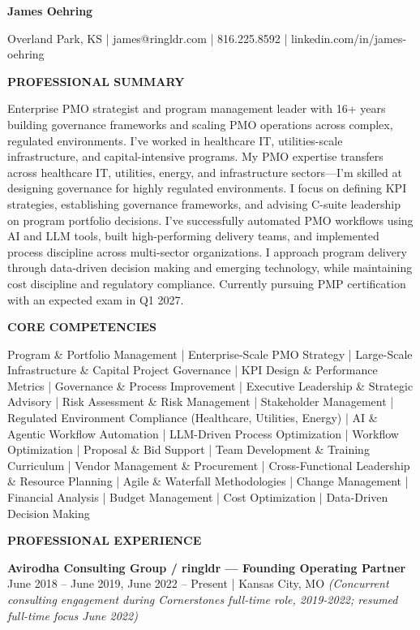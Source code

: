 \documentclass[10pt,letterpaper]{article}
\begin{document}
{\centering \textbf{\Large James Oehring} \par}
{\centering \small Overland Park, KS | james@ringldr.com | 816.225.8592 | linkedin.com/in/james-oehring \par}

\vspace{6pt}

\textbf{PROFESSIONAL SUMMARY}

Enterprise PMO strategist and program management leader with 16+ years building governance frameworks and scaling PMO operations across complex, regulated environments. I've worked in healthcare IT, utilities-scale infrastructure, and capital-intensive programs. My PMO expertise transfers across healthcare IT, utilities, energy, and infrastructure sectors—I'm skilled at designing governance for highly regulated environments. I focus on defining KPI strategies, establishing governance frameworks, and advising C-suite leadership on program portfolio decisions. I've successfully automated PMO workflows using AI and LLM tools, built high-performing delivery teams, and implemented process discipline across multi-sector organizations. I approach program delivery through data-driven decision making and emerging technology, while maintaining cost discipline and regulatory compliance. Currently pursuing PMP certification with an expected exam in Q1 2027.

\vspace{6pt}

\textbf{CORE COMPETENCIES}

Program \& Portfolio Management | Enterprise-Scale PMO Strategy | Large-Scale Infrastructure \& Capital Project Governance | KPI Design \& Performance Metrics | Governance \& Process Improvement | Executive Leadership \& Strategic Advisory | Risk Assessment \& Risk Management | Stakeholder Management | Regulated Environment Compliance (Healthcare, Utilities, Energy) | AI \& Agentic Workflow Automation | LLM-Driven Process Optimization | Workflow Optimization | Proposal \& Bid Support | Team Development \& Training Curriculum | Vendor Management \& Procurement | Cross-Functional Leadership \& Resource Planning | Agile \& Waterfall Methodologies | Change Management | Financial Analysis | Budget Management | Cost Optimization | Data-Driven Decision Making

\vspace{6pt}

\textbf{PROFESSIONAL EXPERIENCE}

\textbf{Avirodha Consulting Group / ringldr --- Founding Operating Partner}
\newline
June 2018 -- June 2019, June 2022 -- Present | Kansas City, MO
\newline
\textit{(Concurrent consulting engagement during Cornerstones full-time role, 2019-2022; resumed full-time focus June 2022)}
\end{document}
